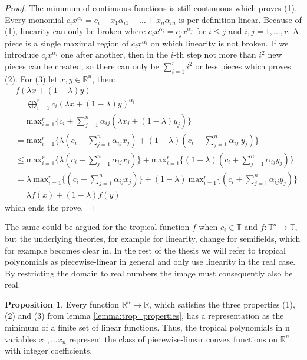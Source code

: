 \documentclass{article}
\theoremstyle{definition}
\newtheorem{proposition}[theorem]{Proposition}
\begin{document}
\begin{proof}
The minimum of continuous functions is still continuous which proves (1). Every monomial $c_ix^{\alpha_i} = c_i + x_{1}\alpha_{i1} + \dots + x_n \alpha_{in}$ is per definition linear. Because of (1), linearity can only be broken where $c_i x^{\alpha_i} = c_j x^{\alpha_j}$ for $i \leq j$ and $i,j = 1, \dots ,r$. A piece is a single maximal region of $c_ix^{\alpha_i}$ on which linearity is not broken. If we introduce $c_ix^{\alpha_i}$ one after another, then in the $i$-th step not more than $i^2$ new pieces can be created, so there can only be $ \sum_{i=1}^{r} i^2$ or less pieces which proves (2). 
For (3) let $x, y \in \mathbb{R}^{n}$, then:
\begin{align*}
&f(\lambda x + (1-\lambda)y) \\
&= \bigoplus^{r}_{i=1} c_{i}(\lambda x + (1-\lambda) y)^{\alpha_{i}} \\
&= \text{max}^{r}_{i=1} \{ c_{i} + \sum_{j=1}^{n} \alpha_{ij}(\lambda x_{j} + (1-\lambda) y_{j}) \} \\
&= \text{max}^{r}_{i=1} \{ \lambda (c_{i} + \sum_{j=1}^{n}\alpha_{ij}x_{j}) + (1-\lambda) (c_{i} + \sum_{j=1}^{n}\alpha_{ij} \ y_{j})\} \\
&\leq \text{max}^{r}_{i=1} \{ \lambda (c_{i} + \sum_{j=1}^{n}\alpha_{ij}x_{j}) \} + \text{max}^{r}_{i=1} \{ (1-\lambda) (c_{i} + \sum_{j=1}^{n}\alpha_{ij}y_{j}) \} \\
&= \lambda \ \text{max}^{r}_{i=1} \{ (c_{i} + \sum_{j=1}^{n}\alpha_{ij}x_{j}) \} + (1-\lambda) \ \text{max}^{r}_{i=1} \{ (c_{i} + \sum_{j=1}^{n}\alpha_{ij}y_{j}) \} \\
&= \lambda f(x) + (1-\lambda) f(y)
\end{align*}
which ends the prove.
\end{proof}

The same could be argued for the tropical function $f$ when $c_{i} \in \mathbb{T}$ and $f:\mathbb{T}^{n} \to \mathbb{T}$, but the underlying theories, for example for linearity, change for semifields, which for example becomes clear in\cite{olia2020analysis}. In the rest of the thesis we will refer to tropical polynomials as piecewise-linear in general and only use linearity in the real case. By restricting the domain to real numbers the image must consequently also be real.

\begin{proposition}
Every function $\mathbb{R}^{n} \to \mathbb{R}$, which satisfies the three properties (1), (2) and (3) from lemma 	\ref{lemma:trop_properties}, has a representation as the minimum of a finite set of linear functions. Thus, the tropical polynomials in n variables $x_{1}, \dots x_{n}$ represent the class of piecewise-linear convex functions on $\mathbb{R}^{n}$ with integer coefficients.
\end{proposition}
\end{document}
